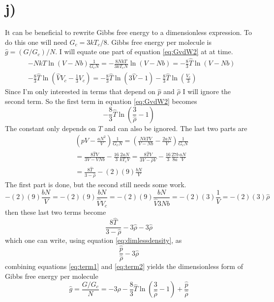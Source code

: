 \documentclass{article}
\begin{document}
\section*{j)}
It can be beneficial to rewrite Gibbs free energy to a dimensionless expression. To do this one will need $G_c = 3kT_c/8$. Gibbs free energy per molecule is $\hat{g} = (G/G_c)/N$. I will equate one part of equation \ref{eq:GvdW2} at at time.
\begin{align*}
& -NkT\ln (V-Nb) \frac{1}{G_cN} = -\frac{8NkT}{3kT_cN}\ln (V-Nb) = -\frac{8}{3} \hat{T}\ln(V-Nb) \\
& -\frac{8}{3}\hat{T} \ln (\hat{V}V_c - \frac{1}{3}V_c) = -\frac{8}{3}\hat{T} \ln (3\hat{V}-1) - \frac{8}{3}\hat{T}\ln(\frac{V_c}{3})
\end{align*}
Since I'm only interested in terms that depend on $\hat{p}$ and $\hat{\rho}$ I will ignore the second term. So the first term in equation \ref{eq:GvdW2} becomes
\begin{equation}
\label{eq:term1}
-\frac{8}{3}\hat{T}\ln \left(\frac{3}{\hat{\rho}}-1 \right)
\end{equation}
The constant only depends on $T$ and can also be ignored. The last two parts are
\begin{align*}
&\left(pV - \frac{aN^2}{V} \right) \frac{1}{G_c N}= \left(\frac{NkTV}{V-Nb} - \frac{2aN}{V} \right) \frac{1}{G_c N} \\
&= \frac{8\hat{T}V}{3V-VNb} - \frac{16}{3}\frac{2aN}{kT_cV} = \frac{8\hat{T}V}{3V-\hat{\rho}V} -\frac{16}{3}\frac{27b}{8a}\frac{aN}{V} \\
&=\frac{8\hat{T}}{3-\hat{\rho}} - (2)(9)\frac{bN}{V}
\end{align*}
The first part is done, but the second still needs some work.
\begin{equation*}
- (2)(9)\frac{bN}{V} = - (2)(9)\frac{bN}{\hat{V}V_c} = - (2)(9)\frac{bN}{\hat{V}3Nb}= - (2)(3)\frac{1}{V} = -(2)(3) \hat{\rho}
\end{equation*}
then these last two terms become 
\begin{equation*}
\frac{8\hat{T}}{3-\hat{\rho}} - 3\hat{\rho} - 3\hat{\rho}
\end{equation*}
which one can write, using equation \ref{eq:dimlessdensity}, as
\begin{equation}
\label{eq:term2}
\frac{\hat{p}}{\hat{\rho}} - 3\hat{\rho}
\end{equation}
combining equations \ref{eq:term1} and \ref{eq:term2} yields the dimensionless form of Gibbs free energy per molecule
\begin{equation}
\hat{g} = \frac{G/G_c}{N} = -3\hat{\rho} -\frac{8}{3}\hat{T}\ln \left( \frac{3}{\hat{\rho}} - 1 \right) + \frac{\hat{p}}{\hat{\rho}}
\end{equation}
\end{document}
